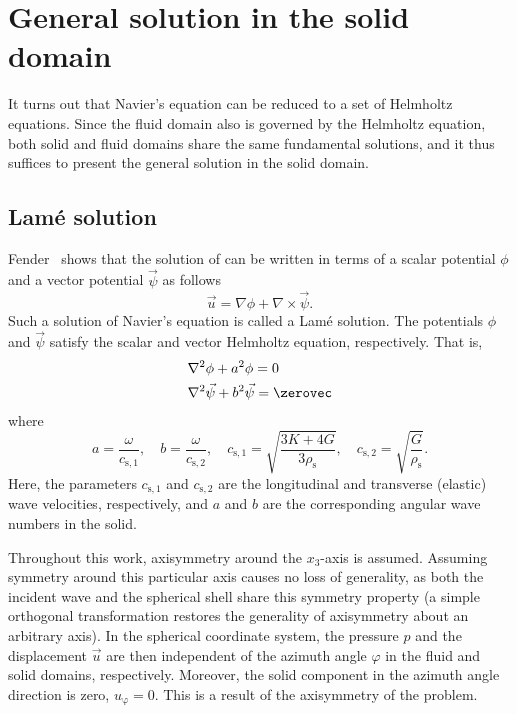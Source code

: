 \section{General solution in the solid domain}
\label{Eq1:generalSolution}
It turns out that Navier's equation can be reduced to a set of Helmholtz equations. Since the fluid domain also is governed by the Helmholtz equation, both solid and fluid domains share the same fundamental solutions, and it thus suffices to present the general solution in the solid domain.

\subsection{Lam\'{e} solution}
Fender~\cite{Fender1972sfa} shows that the solution of  can be written in terms of a scalar potential $\phi$ and a vector potential $\vec{\psi}$ as follows
\begin{equation}\label{Eq1:LameSolution}
	\vec{u} = \nabla\phi + \nabla\times\vec{\psi}.
\end{equation}
Such a solution of Navier's equation is called a Lam\'{e} solution. The potentials $\phi$ and $\vec{\psi}$ satisfy the scalar and vector Helmholtz equation, respectively. That is,
\begin{align}
	&\nabla^2\phi + a^2\phi = 0\label{Eq1:phiHelmholtz}\\
	&\nabla^2\vec{\psi} + b^2\vec{\psi} = \zerovec\label{Eq1:PsiHelmholtz}
\end{align}
where
\begin{equation}\label{Eq1:waveNumber_a_b}
	a=\frac{\omega}{c_{\mathrm{s},1}},\quad b=\frac{\omega}{c_{\mathrm{s},2}},\quad c_{\mathrm{s},1} = \sqrt{\frac{3K+4G}{3\rho_{\mathrm{s}}}},\quad c_{\mathrm{s},2} = \sqrt{\frac{G}{\rho_{\mathrm{s}}}}.
\end{equation}
Here, the parameters $c_{\mathrm{s},1}$ and $c_{\mathrm{s},2}$ are the longitudinal and transverse (elastic) wave velocities, respectively, and $a$ and $b$ are the corresponding angular wave numbers in the solid. 

Throughout this work, axisymmetry around the $x_3$-axis is assumed. Assuming symmetry around this particular axis causes no loss of generality, as both the incident wave and the spherical shell share this symmetry property (a simple orthogonal transformation restores the generality of axisymmetry about an arbitrary axis). In the spherical coordinate system, the pressure $p$ and the displacement $\vec{u}$ are then independent of the azimuth angle $\varphi$ in the fluid and solid domains, respectively. Moreover, the solid component in the azimuth angle direction is zero, $u_\upvarphi=0$. This is a result of the axisymmetry of the problem.

